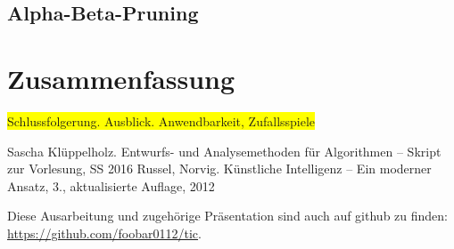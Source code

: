 \documentclass[a4paper,twoside]{scrartcl}
\newcommand\todo[1]{\colorbox{yellow}{#1}}
\begin{document}
\subsection{Alpha-Beta-Pruning}

\section{Zusammenfassung}
\todo{Schlussfolgerung. Ausblick. Anwendbarkeit, Zufallsspiele}

\begin{thebibliography}{99}

 Sascha Klüppelholz.
\newblock Entwurfs- und Analysemethoden für Algorithmen -- Skript zur Vorlesung, SS 2016
 Russel, Norvig.
\newblock Künstliche Intelligenz -- Ein moderner Ansatz, 3., aktualisierte Auflage, 2012
 
\end{thebibliography}

\vspace{4\baselineskip}
Diese Ausarbeitung und zugehörige Präsentation sind auch auf github zu finden: \\\url{https://github.com/foobar0112/tic}.
\end{document}
